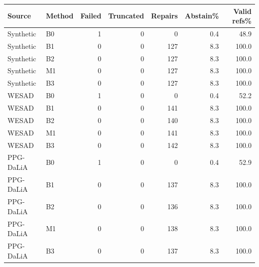 \begin{tabular}{llrrrrr}
\toprule
Source & Method & Failed & Truncated & Repairs & Abstain\% & Valid refs\% \\
\midrule
Synthetic & B0 & 1 & 0 & 0 & 0.4 & 48.9 \\
Synthetic & B1 & 0 & 0 & 127 & 8.3 & 100.0 \\
Synthetic & B2 & 0 & 0 & 127 & 8.3 & 100.0 \\
Synthetic & M1 & 0 & 0 & 127 & 8.3 & 100.0 \\
Synthetic & B3 & 0 & 0 & 127 & 8.3 & 100.0 \\
WESAD & B0 & 1 & 0 & 0 & 0.4 & 52.2 \\
WESAD & B1 & 0 & 0 & 141 & 8.3 & 100.0 \\
WESAD & B2 & 0 & 0 & 140 & 8.3 & 100.0 \\
WESAD & M1 & 0 & 0 & 141 & 8.3 & 100.0 \\
WESAD & B3 & 0 & 0 & 142 & 8.3 & 100.0 \\
PPG-DaLiA & B0 & 1 & 0 & 0 & 0.4 & 52.9 \\
PPG-DaLiA & B1 & 0 & 0 & 137 & 8.3 & 100.0 \\
PPG-DaLiA & B2 & 0 & 0 & 136 & 8.3 & 100.0 \\
PPG-DaLiA & M1 & 0 & 0 & 138 & 8.3 & 100.0 \\
PPG-DaLiA & B3 & 0 & 0 & 137 & 8.3 & 100.0 \\
\bottomrule
\end{tabular}

